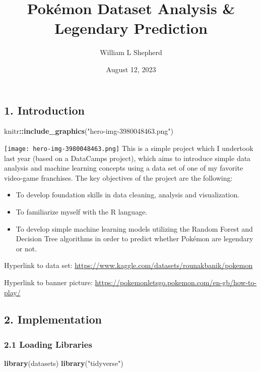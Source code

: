 \documentclass[
]{article}
\title{Pokémon Dataset Analysis \& Legendary Prediction}
\author{William L Shepherd}
\date{August 12, 2023}
\newenvironment{Shaded}{\begin{snugshade}}{\end{snugshade}}
\newcommand{\FunctionTok}[1]{\textcolor[rgb]{0.13,0.29,0.53}{\textbf{#1}}}
\newcommand{\NormalTok}[1]{#1}
\newcommand{\SpecialCharTok}[1]{\textcolor[rgb]{0.81,0.36,0.00}{\textbf{#1}}}
\newcommand{\StringTok}[1]{\textcolor[rgb]{0.31,0.60,0.02}{#1}}
\begin{document}
\maketitle

\subsection{1. Introduction}\label{introduction}

\begin{Shaded}
\begin{Highlighting}[]
\NormalTok{knitr}\SpecialCharTok{::}\FunctionTok{include\_graphics}\NormalTok{(}\StringTok{"hero{-}img{-}3980048463.png"}\NormalTok{)}
\end{Highlighting}
\end{Shaded}

\texttt{[image: hero-img-3980048463.png]} This is a simple project which
I undertook last year (based on a DataCamps project), which aims to
introduce simple data analysis and machine learning concepts using a
data set of one of my favorite video-game franchises. The key objectives
of the project are the following:

\begin{itemize}
\item
  To develop foundation skills in data cleaning, analysis and
  visualization.
\item
  To familiarize myself with the R language.
\item
  To develop simple machine learning models utilizing the Random Forest
  and Decision Tree algorithms in order to predict whether Pokémon are
  legendary or not.
\end{itemize}

Hyperlink to data set:
\url{https://www.kaggle.com/datasets/rounakbanik/pokemon}

Hyperlink to banner picture:
\url{https://pokemonletsgo.pokemon.com/en-gb/how-to-play/}

\subsection{2. Implementation}\label{implementation}

\subsubsection{2.1 Loading Libraries}\label{loading-libraries}

\begin{Shaded}
\begin{Highlighting}[]
\FunctionTok{library}\NormalTok{(datasets) }
\FunctionTok{library}\NormalTok{(}\StringTok{"tidyverse"}\NormalTok{)}
\end{Highlighting}
\end{Shaded}
\end{document}
